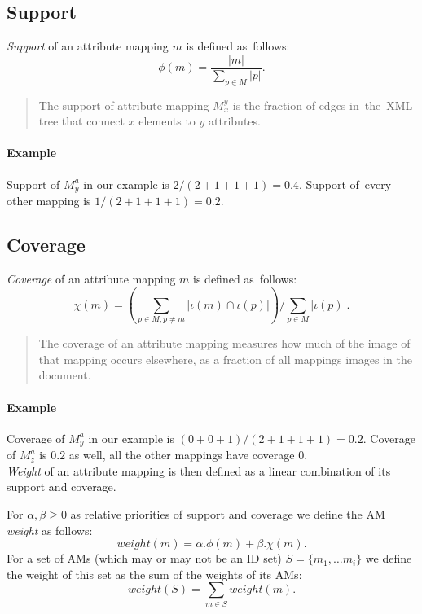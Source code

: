 \subsection{Support}

\begin{define}[Support]
\textit{Support} of an attribute mapping $m$ is defined as~follows:
\[\phi(m) = \frac{|m|}{\sum_{p \in M}|p|}.\]
\end{define}

\begin{quote}
The support of attribute mapping $M_x^y$ is the fraction of edges in~the~XML tree that connect $x$ elements to $y$ attributes.
\end{quote}

\paragraph{Example}
Support of $M_{y}^{a}$ in our example is $2 / (2+1+1+1) = 0.4$. Support of~every other mapping is $1 / (2+1+1+1) = 0.2$.\\

\subsection{Coverage}

\begin{define}[Coverage]
\textit{Coverage} of an attribute mapping $m$ is defined as~follows:
\[\chi(m) = \left( \sum_{p \in M, p \neq m} |\iota(m) \cap \iota(p)| \right) / \sum_{p \in M} |\iota(p)|.\]
\end{define}

\begin{quote}
The coverage of an attribute mapping measures how much of the image of that mapping occurs elsewhere, as a fraction of all mappings images in the document.
\end{quote}

\paragraph{Example}
Coverage of $M_{y}^{a}$ in our example is $(0+0+1) / (2+1+1+1) = 0.2$. Coverage of $M_{z}^{a}$ is $0.2$ as well, all the other mappings have coverage $0$.
\\

\textit{Weight} of an attribute mapping is then defined as a linear combination of its support and coverage.

\begin{define}[Weight]
For $\alpha, \beta \geq 0$ as relative priorities of support and coverage we define the AM \textit{weight} as follows:
\[weight(m) = \alpha . \phi(m) + \beta . \chi(m).\]
For a set of AMs (which may or may not be an ID set) $S = \{m_1, \ldots m_i\}$ we define the weight of this set as the sum of the weights of its AMs:
\[weight(S) = \sum_{m \in S} weight(m).\]
\end{define}

